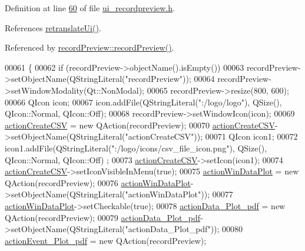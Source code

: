 Definition at line \hyperlink{a00053_source_l00060}{60} of file \hyperlink{a00053_source}{ui\+\_\+recordpreview.\+h}.



References \hyperlink{a00053_source_l00195}{retranslate\+Ui()}.



Referenced by \hyperlink{a00042_source_l00011}{record\+Preview\+::record\+Preview()}.


\begin{DoxyCode}
00061     \{
00062         \textcolor{keywordflow}{if} (recordPreview->objectName().isEmpty())
00063             recordPreview->setObjectName(QStringLiteral(\textcolor{stringliteral}{"recordPreview"}));
00064         recordPreview->setWindowModality(Qt::NonModal);
00065         recordPreview->resize(800, 600);
00066         QIcon icon;
00067         icon.addFile(QStringLiteral(\textcolor{stringliteral}{":/logo/logo"}), QSize(), QIcon::Normal, QIcon::Off);
00068         recordPreview->setWindowIcon(icon);
00069         \hyperlink{a00028_ae81b7303db9e9c5d730c59b86ec0e960}{actionCreateCSV} = \textcolor{keyword}{new} QAction(recordPreview);
00070         \hyperlink{a00028_ae81b7303db9e9c5d730c59b86ec0e960}{actionCreateCSV}->setObjectName(QStringLiteral(\textcolor{stringliteral}{"actionCreateCSV"}));
00071         QIcon icon1;
00072         icon1.addFile(QStringLiteral(\textcolor{stringliteral}{":/logo/icons/csv\_file\_icon.png"}), QSize(), QIcon::Normal, QIcon::Off)
      ;
00073         \hyperlink{a00028_ae81b7303db9e9c5d730c59b86ec0e960}{actionCreateCSV}->setIcon(icon1);
00074         \hyperlink{a00028_ae81b7303db9e9c5d730c59b86ec0e960}{actionCreateCSV}->setIconVisibleInMenu(\textcolor{keyword}{true});
00075         \hyperlink{a00028_aa09067a9c96c9cd78f75261a9fcb89f0}{actionWinDataPlot} = \textcolor{keyword}{new} QAction(recordPreview);
00076         \hyperlink{a00028_aa09067a9c96c9cd78f75261a9fcb89f0}{actionWinDataPlot}->setObjectName(QStringLiteral(\textcolor{stringliteral}{"actionWinDataPlot"}));
00077         \hyperlink{a00028_aa09067a9c96c9cd78f75261a9fcb89f0}{actionWinDataPlot}->setCheckable(\textcolor{keyword}{true});
00078         \hyperlink{a00028_a19203ba5fef3bc68f3d88f1dd3c94777}{actionData\_Plot\_pdf} = \textcolor{keyword}{new} QAction(recordPreview);
00079         \hyperlink{a00028_a19203ba5fef3bc68f3d88f1dd3c94777}{actionData\_Plot\_pdf}->setObjectName(QStringLiteral(\textcolor{stringliteral}{"actionData\_Plot\_pdf"}));
00080         \hyperlink{a00028_a4369770edbf9cb6131a066ca10b3f863}{actionEvent\_Plot\_pdf} = \textcolor{keyword}{new} QAction(recordPreview);

\end{DoxyCode}
